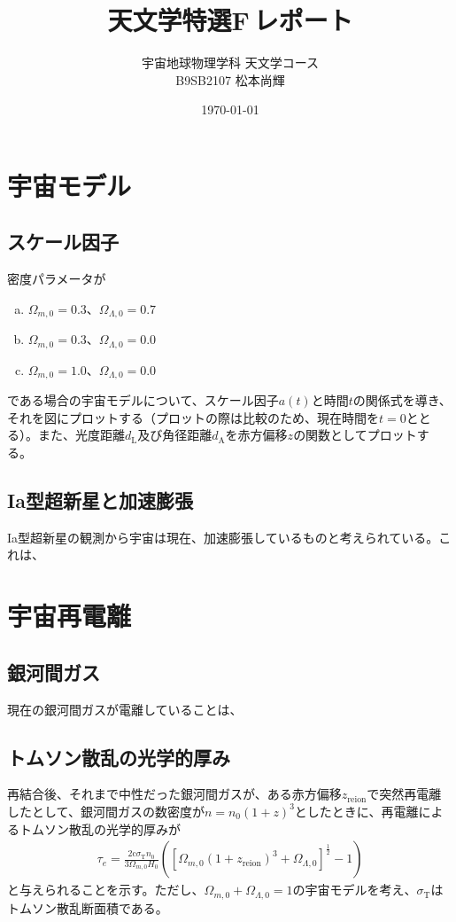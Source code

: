 \documentclass[a4paper,papersize,uplatex,dvipdfmx,10pt]{jsarticle}
\title{天文学特選F\,レポート}
\author{宇宙地球物理学科\,\,天文学コース\\B9SB2107\,\,松本尚輝}
\date{\today}
\begin{document}
\maketitle
\section{宇宙モデル}
\subsection{スケール因子}
密度パラメータが
\begin{enumerate}[(a)]
  \item $\Omega_{m,0}=0.3$、$\Omega_{\Lambda,0}=0.7$
  \item $\Omega_{m,0}=0.3$、$\Omega_{\Lambda,0}=0.0$
  \item $\Omega_{m,0}=1.0$、$\Omega_{\Lambda,0}=0.0$
\end{enumerate}
である場合の宇宙モデルについて、スケール因子$a(t)$と時間$t$の関係式を導き、それを図にプロットする（プロットの際は比較のため、現在時間を$t=0$ととる）。また、光度距離$d_{\mathrm{L}}$及び角径距離$d_{\mathrm{A}}$を赤方偏移$z$の関数としてプロットする。



\subsection{Ia型超新星と加速膨張}
Ia型超新星の観測から宇宙は現在、加速膨張しているものと考えられている。これは、

\section{宇宙再電離}
\subsection{銀河間ガス}
現在の銀河間ガスが電離していることは、

\subsection{トムソン散乱の光学的厚み}
再結合後、それまで中性だった銀河間ガスが、ある赤方偏移$z_{\mathrm{reion}}$で突然再電離したとして、銀河間ガスの数密度が$n=n_{0}(1+z)^{3}$としたときに、再電離によるトムソン散乱の光学的厚みが
\begin{align}
  \tau_{e} = \frac{2\mathrm{c}\sigma_{\mathrm{T}}n_{0}}{3\Omega_{m,0}H_{0}}\left( \left[ \Omega_{m,0}(1+z_{\mathrm{reion}})^{3}+\Omega_{\Lambda,0} \right]^{\frac{1}{2}}-1 \right)
\end{align}
と与えられることを示す。ただし、$\Omega_{m,0}+\Omega_{\Lambda,0}=1$の宇宙モデルを考え、$\sigma_{\mathrm{T}}$はトムソン散乱断面積である。
\end{document}
